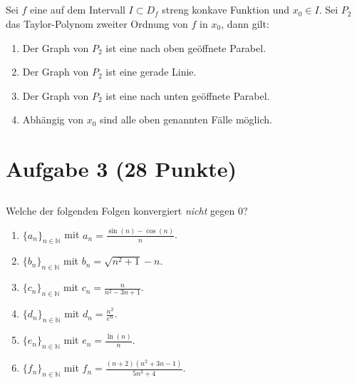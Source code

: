 \subsection*{}
Sei $f$ eine auf dem Intervall $I \subset D_f$ streng konkave Funktion und $x_0 \in I$. Sei $P_2 $ das Taylor-Polynom zweiter Ordnung von $f$ in $x_0$, dann gilt:
\renewcommand{\labelenumi}{(\alph{enumi})}
\begin{enumerate}
	\item 
	Der Graph von $P_2$ ist eine nach oben geöffnete Parabel.
	\item
	Der Graph von $P_2$ ist eine gerade Linie.
	\item
	Der Graph von $P_2$ ist eine nach unten geöffnete Parabel.
	\item
	Abhängig von $x_0$ sind alle oben genannten Fälle möglich.
\end{enumerate}


\newpage
\section*{Aufgabe 3 (28 Punkte)}
\vspace{0.4cm}

\subsection*{}
Welche der folgenden Folgen konvergiert \textit{nicht} gegen $0$?
\renewcommand{\labelenumi}{(\alph{enumi})}
\begin{enumerate}
	\item 
	$ \{a_n\}_{n \in \mathbb{N}} $ mit $a_n = \frac{\sin(n) - \cos(n)}{n}$.
	\item
	$ \{b_n\}_{n \in \mathbb{N}} $ mit $b_n = \sqrt{n^2 + 1 }  - n$.
	\item
	$ \{c_n\}_{n \in \mathbb{N}} $ mit $c_n = \frac{n}{n^2 - 3n +1 }$.
	\item
	$ \{d_n\}_{n \in \mathbb{N}} $ mit $d_n = \frac{n^2}{e^n}$.
	\item
	$ \{e_n\}_{n \in \mathbb{N}} $ mit $e_n = \frac{\ln(n)}{n}$.
	\item
	$ \{f_n\}_{n \in \mathbb{N}} $ mit $f_n = \frac{(n+2) (n^2 + 3n -1 )}{5n^3 + 4}$.
\end{enumerate}
\ \\
